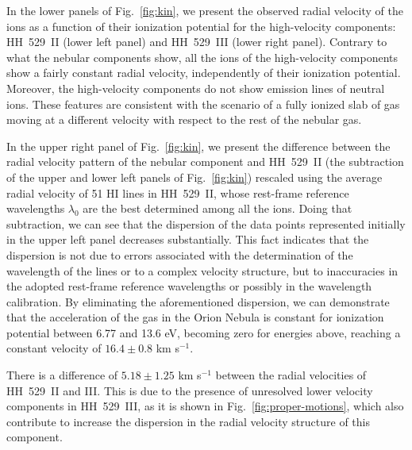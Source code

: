 \documentclass[fleqn,usenatbib]{mnras}
\begin{document}
In the lower panels of Fig.~\ref{fig:kin}, we present the observed radial velocity of the ions as a function of their ionization potential for the high-velocity components: HH~529~II (lower left panel) and HH~529~III (lower right panel). Contrary to what the nebular components show, all the ions of the high-velocity components show a fairly constant radial velocity, independently of their ionization potential. Moreover, the high-velocity components do not show emission lines of neutral ions. These features are  consistent with the scenario of a fully ionized slab of gas moving at a different velocity with respect to the rest of the nebular gas.

In the upper right panel of Fig.~\ref{fig:kin}, we present the difference between the radial velocity pattern of the nebular component and HH~529~II (the subtraction of the upper and lower left panels of Fig.~\ref{fig:kin}) rescaled using the average radial velocity of 51 \mbox{H}\thinspace \mbox{I} lines in HH~529~II, whose rest-frame reference wavelengths $\lambda_0$ are the best determined among all the ions. Doing that  subtraction, we can see that the  dispersion of the data points represented initially in the upper left panel decreases substantially. This fact indicates that the dispersion is not due to errors associated with the determination of the wavelength of the lines or to a complex velocity structure, but to inaccuracies in the adopted rest-frame reference wavelengths or possibly in the wavelength calibration. By eliminating the aforementioned dispersion, we can demonstrate that the acceleration of the gas in the Orion Nebula is constant for  ionization potential between 6.77 and 13.6 eV, becoming zero for energies above, reaching a constant velocity of $16.4 \pm 0.8$ km s$^{-1}$. 


There is a difference of $5.18 \pm 1.25$ km s$^{-1}$ between the radial velocities of HH~529~II and III. This is due to the presence of unresolved lower velocity components in HH~529~III, as it is shown in Fig.~\ref{fig:proper-motions}, which also contribute to increase the dispersion in the radial velocity structure of this component.
\end{document}
